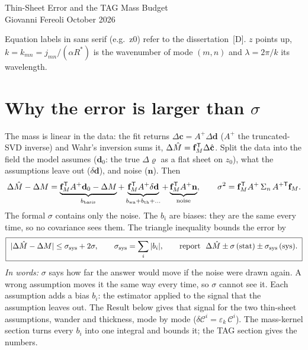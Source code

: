 \documentclass[11pt]{article}
\newcommand{\Ci}{\mathscr{C}^i}\newcommand{\U}{\mathcal{U}}
\newcommand{\D}[1]{\textsf{#1}}   %
\newcommand{\words}[1]{\emph{In words:} #1}
\begin{document}
\begin{center}
{\Large Thin-Sheet Error and the TAG Mass Budget}\\[3pt]
Giovanni Fereoli  October 2026
\end{center}

Equation labels in sans serif (e.g.\ \D{z0}) refer to the dissertation~[D].
$z$ points up, $k=k_{mn}=j_{mn}/(\alpha R^*)$ is the wavenumber of mode
$(m,n)$ and $\lambda=2\pi/k$ its wavelength.

\section*{Why the error is larger than $\sigma$}
The mass is linear in the data: the fit returns
$\Delta\hat{\mathbf c}=A^+\Delta\mathbf d$ ($A^+$ the truncated-SVD inverse)
and Wahr's inversion sums it, $\Delta\hat M=\mathbf f_M^{\sf T}\Delta\hat{\mathbf c}$.
Split the data into the field the model assumes ($\mathbf d_0$: the true
$\Delta\varrho$ as a flat sheet on $z_0$), what the assumptions leave out
($\delta\mathbf d$), and noise ($\mathbf n$). Then
\begin{equation}
  \Delta\hat M-\Delta M=
  \underbrace{\mathbf f_M^{\sf T}A^+\mathbf d_0-\Delta M}_{b_{\rm basis}}
  +\underbrace{\mathbf f_M^{\sf T}A^+\delta\mathbf d}_{b_{\rm wa}+b_{\rm th}+\dots}
  +\underbrace{\mathbf f_M^{\sf T}A^+\mathbf n}_{\rm noise},
  \qquad
  \sigma^2=\mathbf f_M^{\sf T}A^+\,\Sigma_n\,A^{+\sf T}\mathbf f_M .
  \label{eq:split}
\end{equation}
The formal $\sigma$ contains only the noise. The $b_i$ are biases: they are
the same every time, so no covariance sees them. The triangle inequality bounds
the error by
\begin{equation}
  \boxed{\;|\Delta\hat M-\Delta M|\le\sigma_{\rm sys}+2\sigma,\qquad
  \sigma_{\rm sys}=\sum_i|b_i|,\qquad
  \text{report }\ \Delta\hat M\pm\sigma\,(\text{stat})\pm\sigma_{\rm sys}\,(\text{sys}).\;}
  \label{eq:budget}
\end{equation}
\words{$\sigma$ says how far the answer would move if the noise were drawn
again. A wrong assumption moves it the same way every time, so $\sigma$ cannot
see it. Each assumption adds a bias $b_i$: the estimator applied to the signal
that the assumption leaves out. The Result below gives that signal for the two
thin-sheet assumptions, wander and thickness, mode by mode
($\delta\Ci=\varepsilon_k\,\Ci$). The mass-kernel section turns every $b_i$
into one integral and bounds it; the TAG section gives the numbers.}
\end{document}
